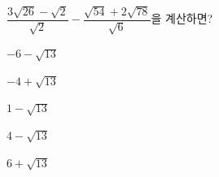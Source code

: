 $\dfrac{3\sqrt{26}-\sqrt{2}}{\sqrt{2}}-\dfrac{\sqrt{54}+2\sqrt{78}}{\sqrt{6}}$을 계산하면?
\begin{choices32}{\rule[-3ex]{0pt}{8ex}$-6-\sqrt{13}$}{\rule[-3ex]{0pt}{8ex}$-4+\sqrt{13}$}{\rule[-3ex]{0pt}{8ex}$1-\sqrt{13}$}{\rule[-3ex]{0pt}{8ex}$4-\sqrt{13}$}{\rule[-3ex]{0pt}{8ex}$6+\sqrt{13}$}\end{choices32}
